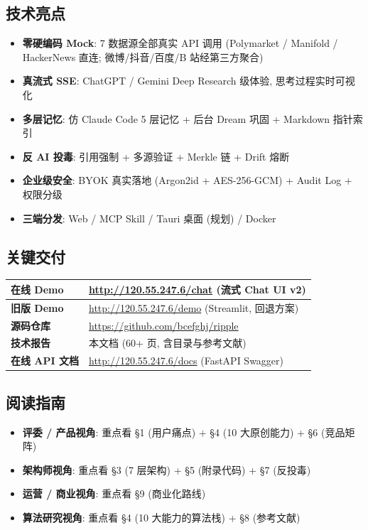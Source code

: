 \subsection*{技术亮点}

\begin{itemize}
    \item \textbf{零硬编码 Mock}: 7 数据源全部真实 API 调用 (Polymarket / Manifold / HackerNews 直连; 微博/抖音/百度/B 站经第三方聚合)
    \item \textbf{真流式 SSE}: ChatGPT / Gemini Deep Research 级体验, 思考过程实时可视化
    \item \textbf{多层记忆}: 仿 Claude Code 5 层记忆 + 后台 Dream 巩固 + Markdown 指针索引
    \item \textbf{反 AI 投毒}: 引用强制 + 多源验证 + Merkle 链 + Drift 熔断
    \item \textbf{企业级安全}: BYOK 真实落地 (Argon2id + AES-256-GCM) + Audit Log + 权限分级
    \item \textbf{三端分发}: Web / MCP Skill / Tauri 桌面 (规划) / Docker
\end{itemize}

\subsection*{关键交付}

\begin{tabularx}{\textwidth}{>{\bfseries}l X}
    \toprule
    在线 Demo & \url{http://120.55.247.6/chat} (流式 Chat UI v2) \\
    \midrule
    旧版 Demo & \url{http://120.55.247.6/demo} (Streamlit, 回退方案) \\
    \midrule
    源码仓库 & \url{https://github.com/bcefghj/ripple} \\
    \midrule
    技术报告 & 本文档 (60+ 页, 含目录与参考文献) \\
    \midrule
    在线 API 文档 & \url{http://120.55.247.6/docs} (FastAPI Swagger) \\
    \bottomrule
\end{tabularx}

\subsection*{阅读指南}

\begin{itemize}
    \item \textbf{评委 / 产品视角}: 重点看 §1 (用户痛点) + §4 (10 大原创能力) + §6 (竞品矩阵)
    \item \textbf{架构师视角}: 重点看 §3 (7 层架构) + §5 (附录代码) + §7 (反投毒)
    \item \textbf{运营 / 商业视角}: 重点看 §9 (商业化路线)
    \item \textbf{算法研究视角}: 重点看 §4 (10 大能力的算法栈) + §8 (参考文献)
\end{itemize}
